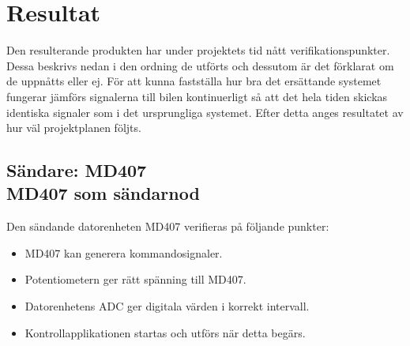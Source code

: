 \documentclass[a4paper]{article}
\begin{document}





\newpage
\section{Resultat}
Den resulterande produkten har under projektets tid nått verifikationspunkter. Dessa beskrivs nedan i den ordning de utförts och dessutom är det förklarat om de uppnåtts eller ej. För att kunna fastställa hur bra det ersättande systemet fungerar jämförs signalerna till bilen kontinuerligt så att det hela tiden skickas identiska signaler som i det ursprungliga systemet. Efter detta anges resultatet av hur väl projektplanen följts.


\subsection{Sändare: MD407 \\ MD407 som sändarnod}
Den sändande datorenheten MD407 verifieras på följande punkter:
\begin{itemize}
\item MD407 kan generera kommandosignaler.
\item Potentiometern ger rätt spänning till MD407.
\item Datorenhetens ADC ger digitala värden i korrekt intervall.
\item Kontrollapplikationen startas och utförs när detta begärs.
\end{itemize}
\end{document}

